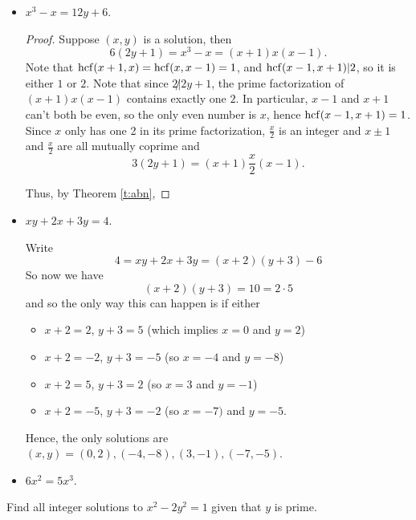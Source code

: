 \documentclass[11pt,dvipsnames]{book}
\def\hcf{{\rm hcf}}
\numberwithin{equation}{section} %
\numberwithin{figure}{section} %
\numberwithin{table}{section} %
\begin{document}
\begin{exercise}
\begin{itemize}
\item $x^3-x=12y+6$. 

\begin{solution}



\begin{proof}
Suppose $(x,y)$ is a solution, then 
\[
6(2y+1) = x^3-x = (x+1)x(x-1).
\]
Note that $\hcf(x+1,x)=\hcf(x,x-1)=1$, and $\hcf(x-1,x+1)|2$, so it is either $1$ or $2$. Note that since $2\not| 2y+1$, the prime factorization of $(x+1)x(x-1)$ contains exactly one $2$. In particular, $x-1$ and $x+1$ can't both be even, so the only even number is $x$, hence $\hcf(x-1,x+1)=1$. Since $x$ only has one 2 in its prime factorization, $\frac{x}{2}$ is an integer and $x\pm 1$ and $\frac{x}{2}$ are all mutually coprime and
\[
3(2y+1)=(x+1)\frac{x}{2}(x-1).
\]


Thus, by Theorem \ref{t:abn}, 


\end{proof}

\end{solution}




\item$xy+2x+3y=4$.


  
  

\begin{solution}
Write
\[
4=xy+2x+3y =(x+2)(y+3)-6
\]
So now we have 
\[
(x+2)(y+3)=10=2\cdot 5\]
and so the only way this can happen is if either 
\begin{itemize}
\item $x+2=2$, $y+3=5$ (which implies $x=0$ and $y=2$)
\item $x+2=-2$, $y+3=-5$ (so $x=-4$ and $y=-8$)
\item $x+2=5$, $y+3=2$ (so $x=3$ and $y=-1$)
\item $x+2=-5$, $y+3=-2$ (so $x=-7)$ and $y=-5$.
\end{itemize}
Hence, the only solutions are $(x,y)=(0,2),(-4,-8),(3,-1),(-7,-5)$. 
\end{solution}

\item $6x^2=5x^3$.
\end{itemize}



\end{exercise}


\begin{exercise} Find all integer solutions to $x^2-2y^2=1$ given that $y$ is prime. 


\end{exercise}
\end{document}
